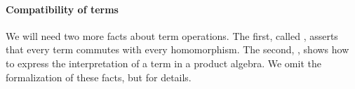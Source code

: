 \ifshort\else
\paragraph*{Compatibility of terms}
\fi
We will need two more facts about term operations.  The first, called
, asserts that every term commutes with every homomorphism.  The second,
, shows how to express the interpretation of a term in a product algebra.
\ifshort
We omit the formalization of these facts, but \seeshort for details.
\else

\begin{code}%
\>[0]\<%
\\
\>[0]\AgdaSpace{}%
\AgdaModule{\AgdaUnderscore{}}\AgdaSpace{}%
\AgdaSymbol{\{}\AgdaSpace{}%
\AgdaSymbol{:}\AgdaSpace{}%
\AgdaSpace{}%
\AgdaSymbol{\}\{}\AgdaSpace{}%
\AgdaSymbol{:}\AgdaSpace{}%
\AgdaSpace{}%
\AgdaSpace{}%
\AgdaSymbol{\}\{}\AgdaSpace{}%
\AgdaSymbol{:}\AgdaSpace{}%
\AgdaSpace{}%
\AgdaSpace{}%
\AgdaSymbol{\}(}\AgdaSpace{}%
\AgdaSymbol{:}\AgdaSpace{}%
\AgdaSpace{}%
\AgdaSpace{}%
\AgdaSymbol{)}\AgdaSpace{}%
\<%
\\
\>[0][@{}l@{\AgdaIndent{0}}]%
\>[1]\AgdaSpace{}%
\AgdaSpace{}%
\AgdaSpace{}%
\AgdaSpace{}%
\AgdaSymbol{(}\AgdaSpace{}%
\AgdaSpace{}%
\AgdaSymbol{)}\<%
\\
%
\>[1]\AgdaSpace{}%
\AgdaSpace{}%
\AgdaSpace{}%
\AgdaSpace{}%
\AgdaSymbol{()}\AgdaSpace{}%
\AgdaSpace{}%
\AgdaSymbol{(}\AgdaSpace{}%
\AgdaSpace{}%
\AgdaSpace{}%
\AgdaSpace{}%
\AgdaSymbol{)}\<%
\\
%
\>[1]\AgdaSpace{}%
\AgdaSpace{}%
\AgdaOperator{\AgdaFunction{𝔻[}}\AgdaSpace{}%
\AgdaSpace{}%
\AgdaOperator{\AgdaFunction{]}}\AgdaSpace{}%
\AgdaSpace{}%
\AgdaSymbol{(}\AgdaSpace{}%
\AgdaSpace{}%
\AgdaSymbol{;}\AgdaSpace{}%
\AgdaSpace{}%

\end{code}
